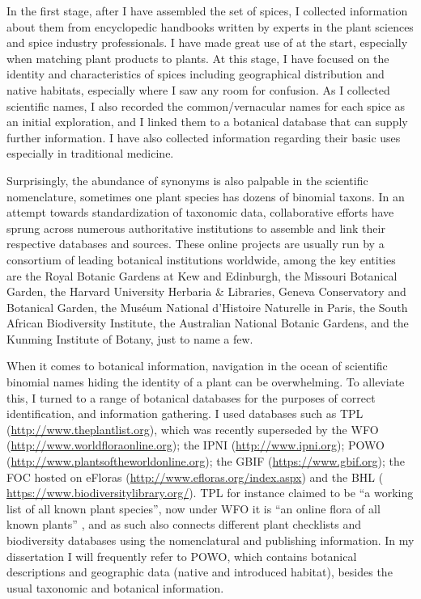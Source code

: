 In the first stage, after I have assembled the set of spices, I collected information about them from encyclopedic handbooks written by experts in the plant sciences and spice industry professionals. I have made great use of \textcites{van_wyk_culinary_2014}{peter_handbook_2012}{hu_food_2005} at the start, especially when matching plant products to plants. At this stage, I have focused on the identity and characteristics of spices including geographical distribution and native habitats, especially where I saw any room for confusion. As I collected scientific names, I also recorded the common/vernacular names for each spice as an initial exploration, and I linked them to a botanical database that can supply further information. I have also collected information regarding their basic uses especially in traditional medicine.

Surprisingly, the abundance of synonyms is also palpable in the scientific nomenclature, sometimes one plant species has dozens of binomial \glspl{taxon}. In an attempt towards standardization of taxonomic data, collaborative efforts have sprung across numerous authoritative institutions to assemble and link their respective databases and sources. These online projects are usually run by a consortium of leading botanical institutions worldwide, among the key entities are the Royal Botanic Gardens at Kew and Edinburgh, the Missouri Botanical Garden, the Harvard University Herbaria \& Libraries, Geneva Conservatory and Botanical Garden, the Muséum National d'Histoire Naturelle in Paris, the South African Biodiversity Institute, the Australian National Botanic Gardens, and the Kunming Institute of Botany, just to name a few.

When it comes to botanical information, navigation in the ocean of scientific binomial names hiding the identity of a plant can be overwhelming. To alleviate this, I turned to a range of botanical databases for the purposes of correct identification, and information gathering. I used databases such as \gls{TPL} (\url{http://www.theplantlist.org}), which was recently superseded by the \gls{WFO} (\url{http://www.worldfloraonline.org}); the \gls{IPNI} (\url{http://www.ipni.org}); \gls{POWO} (\url{http://www.plantsoftheworldonline.org}); the \gls{GBIF} (\url{https://www.gbif.org}); the \gls{FOC} hosted on eFloras (\url{http://www.efloras.org/index.aspx}) and the \gls{BHL} (\url{ https://www.biodiversitylibrary.org/}). \gls{TPL} for instance claimed to be ``a working list of all known plant species'', now under \gls{WFO} it is ``an online flora of all known plants'' , and as such also connects different plant checklists and biodiversity databases using the nomenclatural and publishing information. In my dissertation I will frequently refer to \gls{POWO}, which contains botanical descriptions and geographic data (native and introduced habitat), besides the usual taxonomic and botanical information. 

